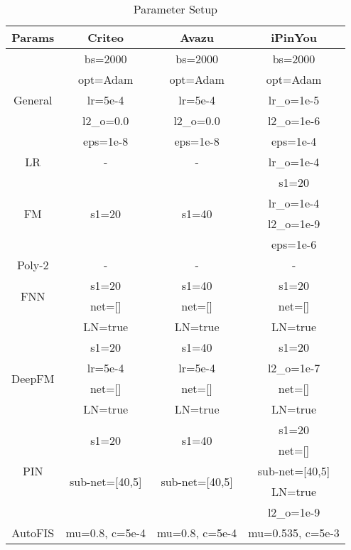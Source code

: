 \documentclass[conference]{IEEEtran}
\begin{document}
\begin{table}[!htbp]
    \renewcommand\arraystretch{1.00}
	\centering
	\caption{Parameter Setup}
	\begin{tabular}{|c|c|c|c|}
		\hline
		    Params & Criteo & Avazu & iPinYou \\
		\hline
		    \multirow{5}{*}{General} & bs=2000 & bs=2000 & bs=2000 \\
		        & opt=Adam & opt=Adam & opt=Adam \\
		        & lr=5e-4 & lr=5e-4 & lr\_o=1e-5 \\
		        & l2\_o=0.0 & l2\_o=0.0 & l2\_o=1e-6 \\
		        & eps=1e-8 & eps=1e-8 & eps=1e-4 \\
		\hline
		    LR & - & - & lr\_o=1e-4 \\
		\hline
		    \multirow{4}{*}{FM} 
		    & \multirow{4}{*}{s1=20} & \multirow{4}{*}{s1=40} & s1=20 \\
		    & & & lr\_o=1e-4 \\
		    & & & l2\_o=1e-9 \\
		    & & & eps=1e-6 \\
		\hline
		    Poly-2 & - & - & - \\
		\hline
		    \multirow{2}{*}{FNN} 
		    & s1=20 & s1=40 & s1=20 \\
		    \multirow{2}{*}{IPNN} 
		    & net=[] & net=[] & net=[] \\
		    & LN=true & LN=true & LN=true \\
		\hline
		    \multirow{4}{*}{DeepFM} 
		    & s1=20 & s1=40 & s1=20 \\
		    & lr=5e-4 & lr=5e-4 & l2\_o=1e-7 \\
		    & net=[] & net=[] & net=[] \\
		    & LN=true & LN=true & LN=true \\
		\hline
		    \multirow{5}{*}{PIN} & \multirow{2}{*}{s1=20} & \multirow{2}{*}{s1=40} & s1=20 \\
		        & \multirow{2}{*}{net=[]} & \multirow{2}{*}{net=[]} & net=[] \\
		        & \multirow{2}{*}{sub-net=[40,5]} & \multirow{2}{*}{sub-net=[40,5]} & sub-net=[40,5] \\
		        & \multirow{2}{*}{LN=true} & \multirow{2}{*}{LN=true} & LN=true  \\
		        & & & l2\_o=1e-9 \\
		\hline
		    \multirow{1}{*}{AutoFIS}  & mu=0.8, c=5e-4 & mu=0.8, c=5e-4 & mu=0.535, c=5e-3 \\

\end{tabular}
\end{table}
\end{document}
